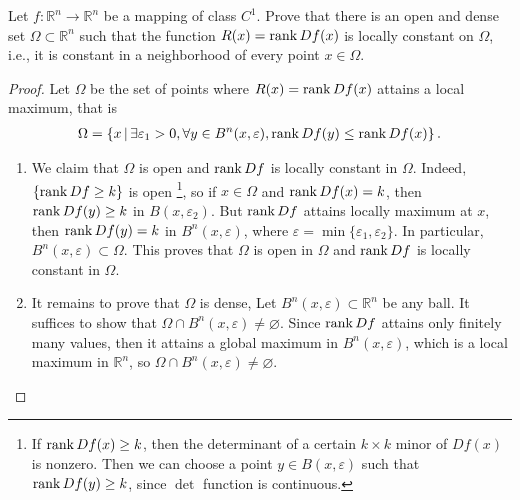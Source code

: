 \documentclass[11pt]{article}
\theoremstyle{definition}
\numberwithin{equation}{subsection}
\begin{document}
Let $f: \mathbb{R}^n \to \mathbb{R}^n$ be a mapping of class $C^1$. Prove that there is an open and dense set $\Omega \subset \mathbb{R}^n$ such that the function $R(x) = \rank Df(x)$ is locally constant on $\Omega$, i.e., it is constant in a neighborhood of every point $x \in \Omega$.
\begin{proof}
Let $\Omega$ be the set of points where $R(x) = \rank Df(x)$ attains a local maximum, that is
\begin{align*}
    \Omega = \left\{x \,|\, \exists \varepsilon_1 > 0, \forall y \in B^n(x, \varepsilon), \rank Df(y) \leq \rank Df(x) \right\}.
\end{align*}
\begin{enumerate}[label=(\alph*)]
    \item We claim that $\Omega$ is open and $\rank Df$ is locally constant in $\Omega$. Indeed, $\{\rank Df \geq k\}$ is open \footnote{If $\rank Df(x) \geq k$, then the determinant of a certain $k\times k$ minor of $Df(x)$ is nonzero. Then we can choose a point $y \in B(x, \varepsilon)$ such that $\rank Df(y) \geq k$, since $\det$ function is continuous.}, so if $x \in \Omega$ and $\rank Df(x) = k$, then $\rank Df(y) \geq k$ in $B(x, \varepsilon_2)$. But $\rank Df$ attains locally maximum at $x$, then $\rank Df(y) = k$ in $B^n(x, \varepsilon)$, where $\varepsilon = \min \{\varepsilon_1, \varepsilon_2\}$. In particular, $B^n(x, \varepsilon) \subset \Omega$. This proves that $\Omega$ is open in $\Omega$ and $\rank Df$ is locally constant in $\Omega$. 
    
    \item It remains to prove that $\Omega$ is dense, Let $B^n(x, \varepsilon) \subset \mathbb{R}^n$ be any ball. It suffices to show that $\Omega \cap B^n(x, \varepsilon) \neq \varnothing$. Since $\rank Df$ attains only finitely many values, then it attains a global maximum in $B^n(x, \varepsilon)$, which is a local maximum in $\mathbb{R}^n$, so $\Omega \cap B^n(x, \varepsilon) \neq \varnothing$.
\end{enumerate}
\end{proof}

\medskip
\end{document}
